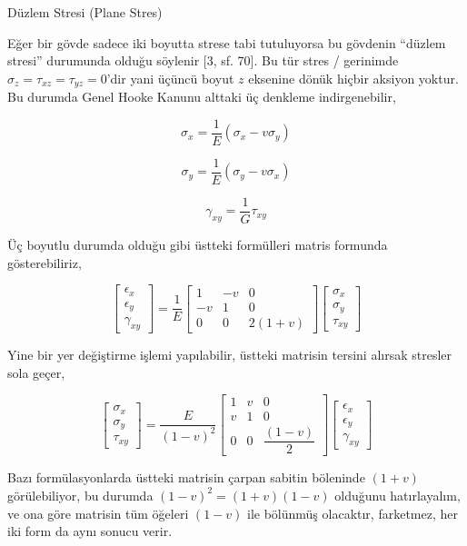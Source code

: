 \documentclass[12pt,fleqn]{article}\usepackage{../../common}
\begin{document}
Düzlem Stresi (Plane Stres)

Eğer bir gövde sadece iki boyutta strese tabi tutuluyorsa bu gövdenin ``düzlem
stresi'' durumunda olduğu söylenir [3, sf. 70]. Bu tür stres / gerinimde
$\sigma_z = \tau_{xz} = \tau_{yz} = 0$'dir yani üçüncü boyut $z$ eksenine dönük
hiçbir aksiyon yoktur. Bu durumda Genel Hooke Kanunu alttaki üç denkleme
indirgenebilir,

$$
\sigma_x = \frac{1}{E} (\sigma_x - v \sigma_y )
$$

$$
\sigma_y = \frac{1}{E} (\sigma_y - v \sigma_x )
$$

$$
\gamma_{xy} = \frac{1}{G} \tau_{xy}
$$

Üç boyutlu durumda olduğu gibi üstteki formülleri matris formunda
gösterebiliriz,

$$
\left[\begin{array}{c}
\epsilon_{x} \\ \epsilon_{y} \\ \gamma_{xy}
\end{array}\right] =
\frac{1}{E}
\left[\begin{array}{ccc}
1 & -v & 0 \\
-v & 1 & 0 \\
0 & 0 & 2(1+v)
\end{array}\right]
\left[\begin{array}{c}
\sigma_x \\ \sigma_y \\ \tau_{xy}
\end{array}\right]
$$

Yine bir yer değiştirme işlemi yapılabilir, üstteki matrisin tersini alırsak
stresler sola geçer, 

$$
\left[\begin{array}{c}
\sigma_x \\ \sigma_y \\ \tau_{xy}
\end{array}\right] = 
\frac{E}{(1-v)^2}
\left[\begin{array}{ccc}
1 & v & 0 \\ v & 1 & 0 \\ 0 & 0 & \dfrac{(1-v)}{2}
\end{array}\right]
\left[\begin{array}{c}
\epsilon_{x} \\ \epsilon_{y} \\ \gamma_{xy}
\end{array}\right] 
$$

Bazı formülasyonlarda üstteki matrisin çarpan sabitin böleninde $(1+v)$
görülebiliyor, bu durumda $(1-v)^2=(1+v)(1-v)$ olduğunu hatırlayalım, ve ona
göre matrisin tüm öğeleri $(1-v)$ ile bölünmüş olacaktır, farketmez, her iki
form da aynı sonucu verir.
\end{document}
